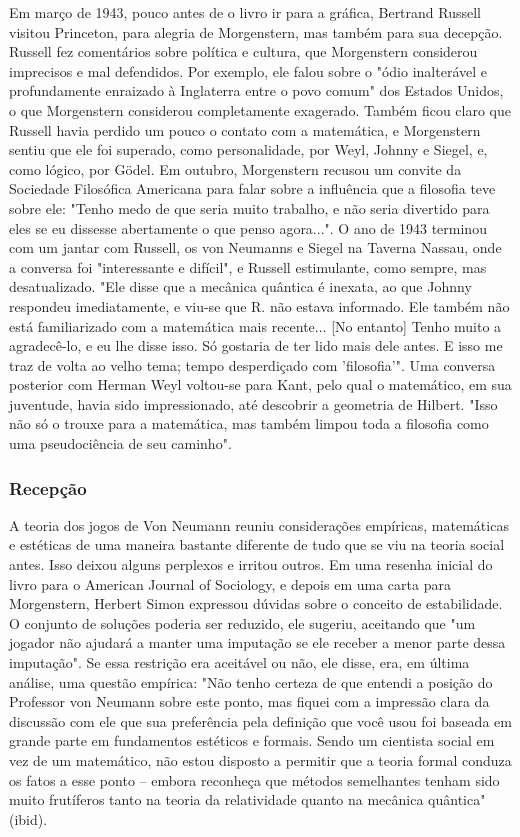 \documentclass[12pt]{article}
\begin{document}
Em março de 1943, pouco antes de o livro ir para a gráfica, Bertrand Russell visitou Princeton, para alegria de Morgenstern, mas também para sua decepção. Russell fez comentários sobre política e cultura, que Morgenstern considerou imprecisos e mal defendidos. Por exemplo, ele falou sobre o "ódio inalterável e profundamente enraizado à Inglaterra entre o povo comum" dos Estados Unidos, o que Morgenstern considerou completamente exagerado. Também ficou claro que Russell havia perdido um pouco o contato com a matemática, e Morgenstern sentiu que ele foi superado, como personalidade, por Weyl, Johnny e Siegel, e, como lógico, por Gödel. Em outubro, Morgenstern recusou um convite da Sociedade Filosófica Americana para falar sobre a influência que a filosofia teve sobre ele: "Tenho medo de que seria muito trabalho, e não seria divertido para eles se eu dissesse abertamente o que penso agora...". O ano de 1943 terminou com um jantar com Russell, os von Neumanns e Siegel na Taverna Nassau, onde a conversa foi "interessante e difícil", e Russell estimulante, como sempre, mas desatualizado. "Ele disse que a mecânica quântica é inexata, ao que Johnny respondeu imediatamente, e viu-se que R. não estava informado. Ele também não está familiarizado com a matemática mais recente... [No entanto] Tenho muito a agradecê-lo, e eu lhe disse isso. Só gostaria de ter lido mais dele antes. E isso me traz de volta ao velho tema; tempo desperdiçado com 'filosofia'". Uma conversa posterior com Herman Weyl voltou-se para Kant, pelo qual o matemático, em sua juventude, havia sido impressionado, até descobrir a geometria de Hilbert. "Isso não só o trouxe para a matemática, mas também limpou toda a filosofia como uma pseudociência de seu caminho".

\subsubsection{\textbf{Recepção}}
A teoria dos jogos de Von Neumann reuniu considerações empíricas, matemáticas e estéticas de uma maneira bastante diferente de tudo que se viu na teoria social antes. Isso deixou alguns perplexos e irritou outros. Em uma resenha inicial do livro para o American Journal of Sociology, e depois em uma carta para Morgenstern, Herbert Simon expressou dúvidas sobre o conceito de estabilidade. O conjunto de soluções poderia ser reduzido, ele sugeriu, aceitando que "um jogador não ajudará a manter uma imputação se ele receber a menor parte dessa imputação". Se essa restrição era aceitável ou não, ele disse, era, em última análise, uma questão empírica: "Não tenho certeza de que entendi a posição do Professor von Neumann sobre este ponto, mas fiquei com a impressão clara da discussão com ele que sua preferência pela definição que você usou foi baseada em grande parte em fundamentos estéticos e formais. Sendo um cientista social em vez de um matemático, não estou disposto a permitir que a teoria formal conduza os fatos a esse ponto – embora reconheça que métodos semelhantes tenham sido muito frutíferos tanto na teoria da relatividade quanto na mecânica quântica" (ibid).
\end{document}
